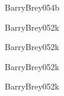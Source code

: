 \begin{syllabus}
\begin{unit}{\ARMultiprocessingDef}{}{BarryBrey05}{4}{b}
    \ARMultiprocessingAllTopics
    \ARMultiprocessingAllObjectives
\end{unit}

\begin{unit}{\ARPerformanceEnhancementsDef}{}{BarryBrey05}{2}{k}
    \ARPerformanceEnhancementsAllTopics
    \ARPerformanceEnhancementsAllObjectives
\end{unit}

\begin{unit}{\ARDistributedArchitecturesDef}{}{BarryBrey05}{2}{k}
    \ARDistributedArchitecturesAllTopics
    \ARDistributedArchitecturesAllObjectives
\end{unit}

\begin{unit}{\ARDevicesDef}{}{BarryBrey05}{2}{k}
    \ARDevicesAllTopics
    \ARDevicesAllObjectives
\end{unit}

\begin{unit}{\ARDirectionsInComputingDef}{}{BarryBrey05}{2}{k}
    \ARDirectionsInComputingAllTopics
    \ARDirectionsInComputingAllObjectives
\end{unit}

\begin{coursebibliography}
\end{coursebibliography}

\end{syllabus}

